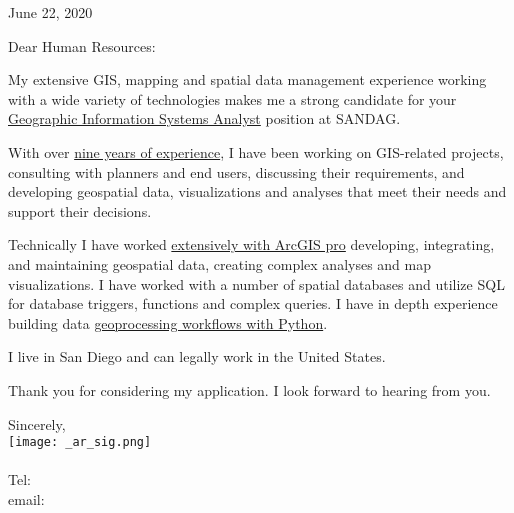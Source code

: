 \documentclass[letterpaper]{article}
\newcommand{\impt}[1]{\uline{#1}}
\newcommand{\CVjobTitle}{Geographic Information Systems Analyst}
\newcommand{\CVcompany}{SANDAG}
\begin{document}
\large

\null\hfill June 22, 2020
\vspace{1em}

Dear Human Resources:

My extensive GIS, mapping and spatial data management experience 
working with a wide variety of 
technologies makes me a strong candidate for your \impt{\CVjobTitle} position
at \CVcompany.

With over \impt{nine years of experience}, I have been working on
GIS-related projects, consulting with planners and end users,
discussing their requirements, and developing geospatial data,
visualizations and analyses that meet their needs and support their
decisions.  

Technically I have worked \impt{extensively with ArcGIS pro}
developing, integrating, and maintaining geospatial data, creating
complex analyses and map visualizations.  
I have worked with a number
of spatial databases and utilize SQL for database triggers, functions
and complex queries.  
I have in depth experience building data \impt{geoprocessing workflows with Python}.  

I live in San Diego and can legally work in the United States.  

Thank you for considering my application.
I look forward to hearing from you.  


Sincerely,\\
    \hspace{1em} 
    \texttt{[image: \_ar\_sig.png]} \\
    \CVname \\
    \small
    Tel: \CVphone \\
    email: \CVemail
\end{document}
